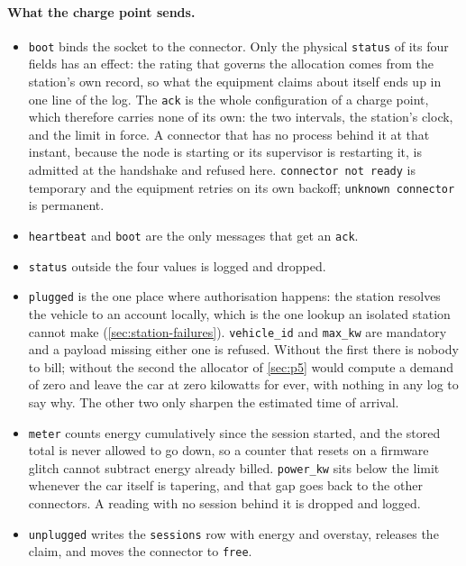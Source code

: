 \paragraph{What the charge point sends.}

\begin{itemize}
  \item \texttt{boot} binds the socket to the connector. Only the physical \texttt{status}
        of its four fields has an effect: the rating that governs the allocation comes from
        the station's own record, so what the equipment claims about itself ends up in one
        line of the log. The \texttt{ack} is the whole configuration of a charge point,
        which therefore carries none of its own: the two intervals, the station's clock, and
        the limit in force. A connector that has no process behind it at that instant,
        because the node is starting or its supervisor is restarting it, is admitted at the
        handshake and refused here. \texttt{connector not ready} is temporary and the
        equipment retries on its own backoff; \texttt{unknown connector} is permanent.
  \item \texttt{heartbeat} and \texttt{boot} are the only messages that get an \texttt{ack}.
  \item \texttt{status} outside the four values is logged and dropped.
  \item \texttt{plugged} is the one place where authorisation happens: the station resolves
        the vehicle to an account locally, which is the one lookup an isolated station
        cannot make (\cref{sec:station-failures}). \texttt{vehicle\_id} and \texttt{max\_kw}
        are mandatory and a payload missing either one is refused. Without the first there
        is nobody to bill; without the second the allocator of \cref{sec:p5} would compute a
        demand of zero and leave the car at zero kilowatts for ever, with nothing in any log
        to say why. The other two only sharpen the estimated time of arrival.
  \item \texttt{meter} counts energy cumulatively since the session started, and the stored
        total is never allowed to go down, so a counter that resets on a firmware glitch
        cannot subtract energy already billed. \texttt{power\_kw} sits below the limit
        whenever the car itself is tapering, and that gap goes back to the other connectors.
        A reading with no session behind it is dropped and logged.
  \item \texttt{unplugged} writes the \texttt{sessions} row with energy and overstay,
        releases the claim, and moves the connector to \texttt{free}.
\end{itemize}

